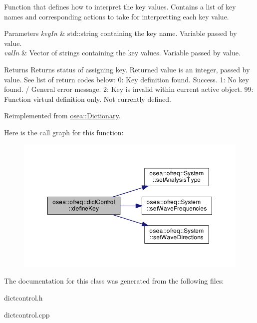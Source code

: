 Function that defines how to interpret the key values. Contains a list of key names and corresponding actions to take for interpretting each key value. 


\begin{DoxyParams}{Parameters}
{\em key\-In} & std\-::string containing the key name. Variable passed by value. \\
\hline
{\em val\-In} & Vector of strings containing the key values. Variable passed by value. \\
\hline
\end{DoxyParams}
\begin{DoxyReturn}{Returns}
Returns status of assigning key. Returned value is an integer, passed by value. See list of return codes below\-: 0\-: Key definition found. Success. 1\-: No key found. / General error message. 2\-: Key is invalid within current active object. 99\-: Function virtual definition only. Not currently defined. 
\end{DoxyReturn}


Reimplemented from \hyperlink{classosea_1_1_dictionary_ae96470181c8b1762204493fa45e96d7c}{osea\-::\-Dictionary}.



Here is the call graph for this function\-:\nopagebreak
\begin{figure}[H]
\begin{center}
\leavevmode
\includegraphics[width=350pt]{classosea_1_1ofreq_1_1dict_control_a048421f7c1bc9b8a023a159c59407bb9_cgraph}
\end{center}
\end{figure}




The documentation for this class was generated from the following files\-:\begin{DoxyCompactItemize}
\item 
dictcontrol.\-h\item 
dictcontrol.\-cpp\end{DoxyCompactItemize}
